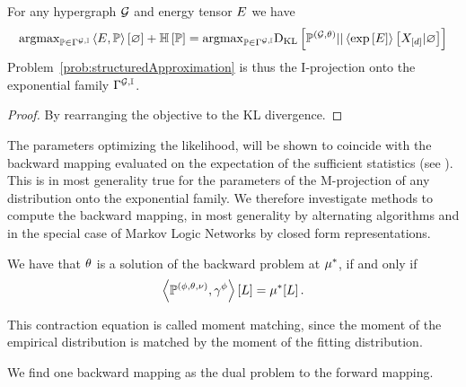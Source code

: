 \begin{theorem}
	For any hypergraph $\mathcal{G}$ and energy tensor $E$ we have 
	\begin{align*}
		\mathrm{argmax}_{\mathbb{P}\in \Gamma^{\mathcal{G},\mathbb{I}}} \left\langle E, \mathbb{P}\right\rangle \left[ \varnothing \right]+ \mathbb{H}\left[\mathbb{P}\right]
		= \mathrm{argmax}_{\mathbb{P}\in \Gamma^{\mathcal{G},\mathbb{I}}} \mathrm{D}_{\mathrm{KL}}\left[ \mathbb{P}^{(\mathcal{G},\theta)} || \left\langle \mathrm{exp}\left[E\right]\right\rangle \left[ X_{[d]} | \varnothing \right] \right]
	\end{align*}
	Problem~\ref{prob:structuredApproximation} is thus the I-projection onto the exponential family $\Gamma^{\mathcal{G},\mathbb{I}}$.
\end{theorem}
\begin{proof}
	By rearranging the objective to the KL divergence.
\end{proof}









The parameters optimizing the likelihood, will be shown to coincide with the backward mapping evaluated on the expectation of the sufficient statistics (see ).
This is in most generality true for the parameters of the M-projection of any distribution onto the exponential family.
We therefore investigate methods to compute the backward mapping, in most generality by alternating algorithms and in the special case of Markov Logic Networks by closed form representations.




	We have that $\theta$ is a solution of the backward problem at $\mu^*$, if and only if 
		\[ \left\langle \mathbb{P}^{(\phi,\theta,\nu)},\gamma^{\phi}\right\rangle \left[ L \right] = \mu^*[L] \, . \]

This contraction equation is called moment matching, since the moment of the empirical distribution is matched by the moment of the fitting distribution.

We find one backward mapping as the dual problem to the forward mapping.



